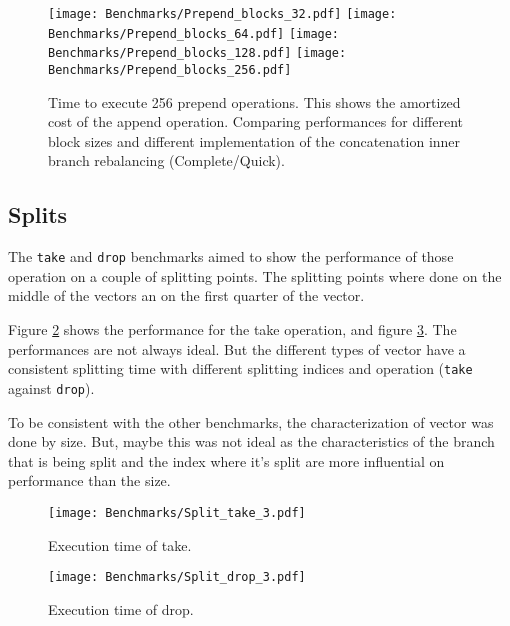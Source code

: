 \begin{figure}[h!]
  \centering
  \texttt{[image: Benchmarks/Prepend\_blocks\_32.pdf]}
  \texttt{[image: Benchmarks/Prepend\_blocks\_64.pdf]}
  \texttt{[image: Benchmarks/Prepend\_blocks\_128.pdf]}
  \texttt{[image: Benchmarks/Prepend\_blocks\_256.pdf]}
  \caption{Time to execute 256 prepend operations. This shows the amortized cost of the append operation. Comparing performances for different block sizes and different implementation of the concatenation inner branch rebalancing (Complete/Quick).}
  \label{PrependBlocksBenchmarks}
\end{figure}

\FloatBarrier

\subsection{Splits}
The \texttt{take} and \texttt{drop} benchmarks aimed to show the performance of those operation on a couple of splitting points. The splitting points where done on the middle of the vectors an on the first quarter of the vector. 
  
Figure \ref{TakeBenchmarks} shows the performance for the take operation, and figure \ref{DropBenchmarks}. The performances are not always ideal. But the different types of vector have a consistent splitting time with different splitting indices and operation (\texttt{take} against \texttt{drop}). 
 
To be consistent with the other benchmarks, the characterization of vector was done by size. But, maybe this was not ideal as the characteristics of the branch that is being split and the index where it's split are more influential on performance than the size. 


\begin{figure}[h!]
  \centering
  \texttt{[image: Benchmarks/Split\_take\_3.pdf]}
  \caption{Execution time of take.}
  \label{TakeBenchmarks}
\end{figure}


\begin{figure}[h!]
  \centering
  \texttt{[image: Benchmarks/Split\_drop\_3.pdf]}
  \caption{Execution time of drop.}
  \label{DropBenchmarks}
\end{figure}


